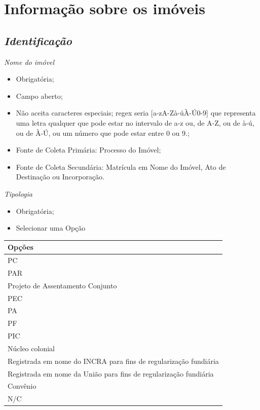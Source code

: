 \documentclass[
  letterpaper,
]{report}
\providecommand{\tightlist}{%
  \setlength{\itemsep}{0pt}\setlength{\parskip}{0pt}}\usepackage{longtable,booktabs,array}
\begin{document}
\hypertarget{informauxe7uxe3o-sobre-os-imuxf3veis}{%
\section{Informação sobre os
imóveis}\label{informauxe7uxe3o-sobre-os-imuxf3veis}}

\hypertarget{identificauxe7uxe3o}{%
\subsection{\texorpdfstring{\emph{Identificação}}{Identificação}}\label{identificauxe7uxe3o}}

\emph{Nome do imóvel}

\begin{itemize}
\tightlist
\item
  Obrigatória;
\item
  Campo aberto;
\item
  Não aceita caracteres especiais; regex seria {[}a-zA-Zà-úÀ-Ú0-9{]} que
  representa uma letra qualquer que pode estar no intervalo de a-z ou,
  de A-Z, ou de à-ú, ou de À-Ú, ou um número que pode estar entre 0 ou
  9.;
\item
  Fonte de Coleta Primária: Processo do Imóvel;
\item
  Fonte de Coleta Secundária: Matrícula em Nome do Imóvel, Ato de
  Destinação ou Incorporação.
\end{itemize}

\emph{Tipologia}

\begin{itemize}
\tightlist
\item
  Obrigatória;
\item
  Selecionar uma Opção
\end{itemize}

\begin{longtable}[]{@{}l@{}}
\toprule()
Opções \\
\midrule()
\endhead
PC \\
PAR \\
Projeto de Assentamento Conjunto \\
PEC \\
PA \\
PF \\
PIC \\
Núcleo colonial \\
Registrada em nome do INCRA para fins de regularização fundiária \\
Registrada em nome da União para fins de regularização fundiária \\
Convênio \\
N/C \\
\bottomrule()
\end{longtable}
\end{document}
